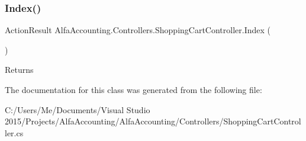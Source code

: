 \subsubsection{\texorpdfstring{Index()}{Index()}}
{\footnotesize\ttfamily Action\+Result Alfa\+Accounting.\+Controllers.\+Shopping\+Cart\+Controller.\+Index (\begin{DoxyParamCaption}{ }\end{DoxyParamCaption})}





\begin{DoxyReturn}{Returns}

\end{DoxyReturn}


The documentation for this class was generated from the following file\+:\begin{DoxyCompactItemize}
\item 
C\+:/\+Users/\+Me/\+Documents/\+Visual Studio 2015/\+Projects/\+Alfa\+Accounting/\+Alfa\+Accounting/\+Controllers/Shopping\+Cart\+Controller.\+cs\end{DoxyCompactItemize}
